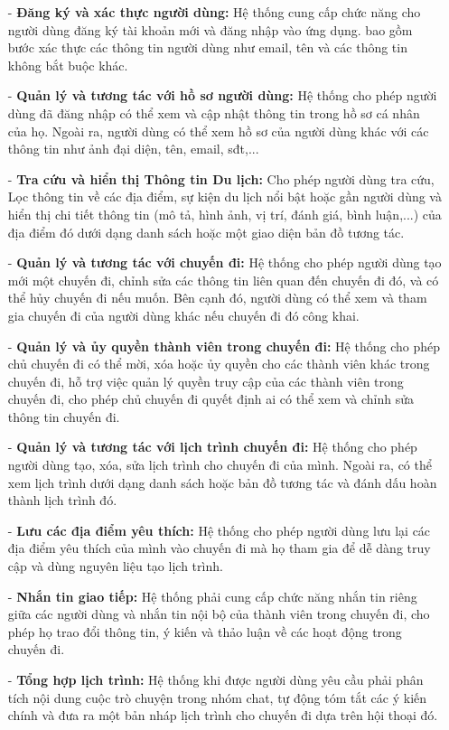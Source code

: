 \begin{itemize}
    \item[-] \textbf{Đăng ký và xác thực người dùng:} Hệ thống cung cấp chức năng cho người dùng đăng ký tài khoản mới và đăng nhập vào ứng dụng. bao gồm bước xác thực các thông tin người dùng như email, tên và các thông tin không bắt buộc khác.
    \item[-] \textbf{Quản lý và tương tác với hồ sơ người dùng:} Hệ thống cho phép người dùng đã đăng nhập có thể xem và cập nhật thông tin trong hồ sơ cá nhân của họ. Ngoài ra, người dùng có thể xem hồ sơ của người dùng khác với các thông tin như ảnh đại diện, tên, email, sđt,...
    \item[-] \textbf{Tra cứu và hiển thị Thông tin Du lịch:} Cho phép người dùng tra cứu, Lọc thông tin về các địa điểm, sự kiện du lịch nổi bật hoặc gần người dùng và hiển thị chi tiết thông tin (mô tả, hình ảnh, vị trí, đánh giá, bình luận,...) của địa điểm đó dưới dạng danh sách hoặc một giao diện bản đồ tương tác.
    \item[-] \textbf{Quản lý và tương tác với chuyến đi:} Hệ thống cho phép người dùng tạo mới một chuyến đi, chỉnh sửa các thông tin liên quan đến chuyến đi đó, và có thể hủy chuyến đi nếu muốn. Bên cạnh đó, người dùng có thể xem và tham gia chuyến đi của người dùng khác nếu chuyến đi đó công khai.
    \item[-] \textbf{Quản lý và ủy quyền thành viên trong chuyến đi:} Hệ thống cho phép chủ chuyến đi có thể mời, xóa hoặc ủy quyền cho các thành viên khác trong chuyến đi, hỗ trợ việc quản lý quyền truy cập của các thành viên trong chuyến đi, cho phép chủ chuyến đi quyết định ai có thể xem và chỉnh sửa thông tin chuyến đi.
    \item[-] \textbf{Quản lý và tương tác với lịch trình chuyến đi:} Hệ thống cho phép người dùng tạo, xóa, sửa lịch trình cho chuyến đi của mình. Ngoài ra, có thể xem lịch trình dưới dạng danh sách hoặc bản đồ tương tác và đánh dấu hoàn thành lịch trình đó.
    \item[-] \textbf{Lưu các địa điểm yêu thích:} Hệ thống cho phép người dùng lưu lại các địa điểm yêu thích của mình vào chuyến đi mà họ tham gia để dễ dàng truy cập và dùng nguyên liệu tạo lịch trình.
    \item[-] \textbf{Nhắn tin giao tiếp:} Hệ thống phải cung cấp chức năng nhắn tin riêng giữa các người dùng và nhắn tin nội bộ của thành viên trong chuyến đi, cho phép họ trao đổi thông tin, ý kiến và thảo luận về các hoạt động trong chuyến đi.
    \item[-] \textbf{Tổng hợp lịch trình:} Hệ thống khi được người dùng yêu cầu phải phân tích nội dung cuộc trò chuyện trong nhóm chat, tự động tóm tắt các ý kiến chính và đưa ra một bản nháp lịch trình cho chuyến đi dựa trên hội thoại đó.

\end{itemize}
